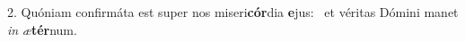 2. Quóniam confirmáta est super nos miseri\textbf{cór}dia \textbf{e}jus: \ast\  et véritas Dómini manet \textit{in} \textit{æ}\textbf{tér}num.\

